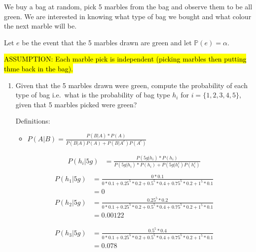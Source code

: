 \documentclass[11pt,onecolumn]{article}
\begin{document}
\begin{enumerate}
    We buy a bag at random, pick 5 marbles from the bag and observe them to be all green. We are interested in knowing what type of bag we bought and what colour the next marble will be. 
    
    Let $e$ be the event that the 5 marbles drawn are green and let $\mathbb{P}(e) = \alpha$. 
    
    \hl{ASSUMPTION: Each marble pick is independent (picking marbles then putting thme back in the bag).}

    \begin{enumerate}
        \item Given that the 5 marbles drawn were green, compute the probability of each type of bag i.e.\ what is the probability of bag type $h_i$ for $i = \{1, 2, 3, 4, 5\}$, given that 5 marbles picked were green?
        \setlength{\parskip}{6pt}
            
        Definitions:
        \begin{itemize}
            \item $P(A \vert B) = \frac{P(B \vert A)*P(A)}{P(B \vert A)P(A) + P(B \vert A^c)P(A^c)}$
        \end{itemize}
        \begin{equation}
            \begin{aligned}
                P(h_i \vert 5g) &= \frac{P(5g \vert h_i)*P(h_i)}{P(5g \vert h_i)*P(h_i) + P(5g \vert h_i^c)P(h_i^c)} \\ 
            \end{aligned}
        \end{equation}
        \begin{equation}
            \begin{aligned}
                P(h_1 \vert 5g) &= \frac{0*0.1}{0*0.1 + 0.25^5*0.2 +  0.5^5*0.4 + 0.75^5*0.2 + 1^5*0.1} \\
                & = 0
            \end{aligned}
        \end{equation}
        \begin{equation}
            \begin{aligned}
                P(h_2 \vert 5g) &= \frac{0.25^5*0.2}{0*0.1 + 0.25^5*0.2 +  0.5^5*0.4 + 0.75^5*0.2 + 1^5*0.1} \\
                & = 0.00122
            \end{aligned}
        \end{equation}

        \begin{equation}
            \begin{aligned}
                P(h_3 \vert 5g) &= \frac{0.5^5*0.4}{0*0.1 + 0.25^5*0.2 +  0.5^5*0.4 + 0.75^5*0.2 + 1^5*0.1} \\
                & = 0.078
            \end{aligned}
        \end{equation}


\end{enumerate}
\end{enumerate}
\end{document}
